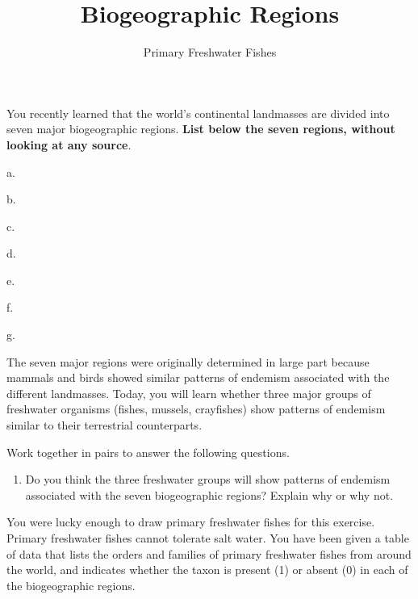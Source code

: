 \documentclass[11pt]{article}
\title{Biogeographic Regions}
\author{Primary Freshwater Fishes}
\date{}                                           %
\begin{document}
\maketitle
\thispagestyle{empty}


You recently learned that the world's continental landmasses are divided
into seven major biogeographic regions. \textbf{List below the seven
regions, without looking at any source}.

\begin{multicols}{2}
a.\vspace{0.5\baselineskip}

b.\vspace{0.5\baselineskip}

c.\vspace{0.5\baselineskip}

d.\vspace{0.5\baselineskip}

\columnbreak

e.\vspace{0.5\baselineskip}

f.\vspace{0.5\baselineskip}

g.\vspace{0.5\baselineskip}

\end{multicols}

The seven major regions were originally determined in large part because
mammals and birds showed similar patterns of endemism associated with
the different landmasses. Today, you will learn whether three major
groups of freshwater organisms (fishes, mussels, crayfishes) show
patterns of endemism similar to their terrestrial counterparts.

Work together in pairs to answer the following questions.

\begin{enumerate}[leftmargin=*]
\item Do you think the three freshwater groups will show patterns of
endemism associated with the seven biogeographic regions? Explain why or
why not.\vspace{10\baselineskip}

\end{enumerate}

You were lucky enough to draw primary freshwater fishes for this
exercise. Primary freshwater fishes cannot tolerate salt water. You have
been given a table of data that lists the orders and families of primary
freshwater fishes from around the world, and indicates whether the taxon
is present (1) or absent (0) in each of the biogeographic regions.
\end{document}
